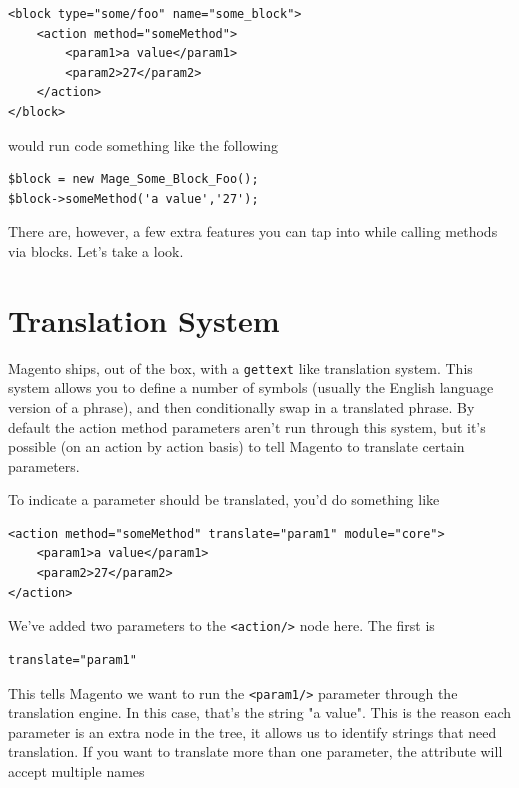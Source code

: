 \documentclass[oneside]{book}
\begin{document}
\begin{lstlisting}
<block type="some/foo" name="some_block">
    <action method="someMethod">
        <param1>a value</param1>
        <param2>27</param2>
    </action>
</block>

\end{lstlisting}


would run code something like the following

\begin{lstlisting}
$block = new Mage_Some_Block_Foo();
$block->someMethod('a value','27');

\end{lstlisting}


There are, however, a few extra features you can tap into while calling methods via blocks.  Let's take a look.

\section{Translation System}

Magento ships, out of the box, with a \footnotesize\texttt{gettext} \normalsize  like translation system.  This system allows you to define a number of symbols (usually the English language version of a phrase), and then conditionally swap in a translated phrase.  By default the action method parameters aren't run through this system, but it's possible (on an action by action basis) to tell Magento to translate certain parameters.

To indicate a parameter should be translated, you'd do something like

\begin{lstlisting}
<action method="someMethod" translate="param1" module="core">
    <param1>a value</param1>
    <param2>27</param2>
</action>

\end{lstlisting}


We've added two parameters to the \footnotesize\texttt{\textless action/\textgreater } \normalsize  node here. The first is

\begin{lstlisting}
translate="param1"

\end{lstlisting}


This tells Magento we want to run the \footnotesize\texttt{\textless param1/\textgreater } \normalsize  parameter through the translation engine.  In this case, that's the string "a value".  This is the reason each parameter is an extra node in the tree, it allows us to identify strings that need translation.  If you want to translate more than one parameter, the attribute will accept multiple names
\end{document}
